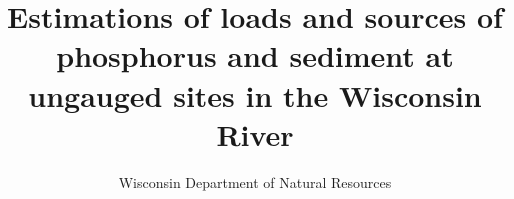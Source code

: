 \documentclass[10pt,letterpaper,draft]{article}
\author{Wisconsin Department of Natural Resources}
\title{Estimations of loads and sources of phosphorus and sediment at ungauged sites in the Wisconsin River}
\begin{document}
\maketitle
\pagebreak

\tableofcontents
\pagebreak

\listoffigures
\pagebreak

\listoftables
\pagebreak









\end{document}
